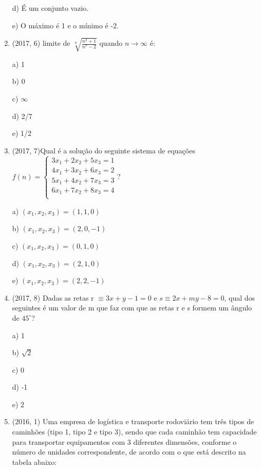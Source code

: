 \documentclass{article}
\begin{document}
\begin{enumerate}
d) É um conjunto vazio.

e) O máximo é 1 e o mínimo é -2.\newline





\item (2017, 6) limite de $\sqrt[n]{\frac{n^2+1}{n^7-2}}$ quando $n\rightarrow \infty$ é:

a) 1

b) 0

c) $\infty$

d) 2/7

e) 1/2\newline




\item (2017, 7)Qual é a solução do seguinte sistema de equações $
f(n) = \left \{ \begin{matrix} 
3x_1 + 2x_2 + 5x_3 =1\\
4x_1 + 3x_2 + 6x_3 =2\\
5x_1 + 4x_2 + 7x_3 =3\\
6x_1 + 7x_2 + 8x_3 =4\\
\end{matrix} \right.$? \newline

a) $(x_1 , x_2 , x_3 ) = (1,1,0)$

b) $(x_1 , x_2 , x_3 ) = (2,0, -1)$

c) $(x_1 , x_2 , x_3 ) = (0,1,0)$

d) $(x_1 , x_2 , x_3 ) = (2,1,0)$

e) $(x_1 , x_2 , x_3 ) = (2,2, -1)$\newline








\item (2017, 8) Dadas as retas r $\equiv 3x + y - 1 = 0$ e $s \equiv 2x + my - 8 = 0 $, qual dos seguintes é um
valor de m que faz com que as retas r e s formem um ângulo de $45^\circ$?

a) 1

b) $\sqrt{2}$

c) 0

d) -1

e) 2\newline







\item (2016, 1) Uma empresa de logística e transporte rodoviário tem três tipos de caminhões (tipo
1, tipo 2 e tipo 3), sendo que cada caminhão tem capacidade para transportar equipamentos com 3
diferentes dimensões, conforme o número de unidades correspondente, de acordo com o que está
descrito na tabela abaixo:\newline


\end{enumerate}
\end{document}
